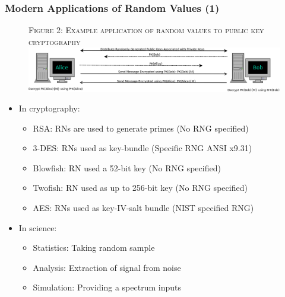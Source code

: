 \documentclass{beamer}
\begin{document}
\begin{frame}
\frametitle{Modern Applications of Random Values (1)}

\begin{figure}
\vspace{-1 em}
{\tiny \textsc{Figure 2: Example application of random values to public key cryptography}}\\
\vspace{0.5 em}
\includegraphics[scale = 0.25]{images/PKC.png}
\end{figure}


\begin{itemize}
	\item In cryptography:
	\begin{itemize}
		\item RSA: RNs are used to generate primes (No RNG specified)
		\item 3-DES: RNs used as key-bundle (Specific RNG ANSI x9.31)
		\item Blowfish: RN used a 52-bit key (No RNG specified)
		\item Twofish: RN used as up to 256-bit key (No RNG specified)
		\item AES: RNs used as key-IV-salt bundle (NIST specified RNG)
	\end{itemize}
	\item In science:
	\begin{itemize}
		\item Statistics: Taking random sample
		\item Analysis: Extraction of signal from noise
		\item Simulation: Providing a spectrum inputs
	\end{itemize}

\end{itemize}

\end{frame}
\end{document}
